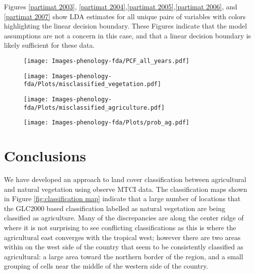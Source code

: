 Figures \ref{partimat 2003}, \ref{partimat 2004},\ref{partimat 2005},\ref{partimat 2006}, and \ref{partimat 2007} show LDA estimates for all unique pairs of variables with colors highlighting the linear decision boundary. These Figures indicate that the model assumptions are not a concern in this case, and that a linear decision boundary is likely sufficient for these data. 

\begin{figure}
	[htbp] \centering 
	\texttt{[image: Images-phenology-fda/PCF\_all\_years.pdf]}  \label{fig:pcf all years} 
\end{figure}

\begin{figure}
	[htbp] \centering 
	\texttt{[image: Images-phenology-fda/Plots/misclassified\_vegetation.pdf]}  
	\label{fig:misclassified vegetation} 
\end{figure}

\begin{figure}
	[htbp] \centering 
	\texttt{[image: Images-phenology-fda/Plots/misclassified\_agriculture.pdf]}  
	\label{fig:misclassified agriculture} 
\end{figure}

\begin{figure}
	[htbp] \centering 
	\texttt{[image: Images-phenology-fda/Plots/prob\_ag.pdf]}  
	\label{fig:probability map} 
\end{figure}


\label{sec:results}


\section{Conclusions} 
We have developed an approach to land cover classification between agricultural and natural vegetation using observe MTCI data. The classification maps shown in Figure \ref{fig:classification map} indicate that a large number of locations that the GLC2000 based classification labelled as natural vegetation are being classified as agriculture. Many of the discrepancies are along the center ridge of where it is not surprising to see conflicting classifications as this is where the agricultural east converges with the tropical west; however there are two areas within on the west side of the country that seem to be consistently classified as agricultural: a large area toward the northern border of the region, and a small grouping of cells near the middle of the western side of the country. 

